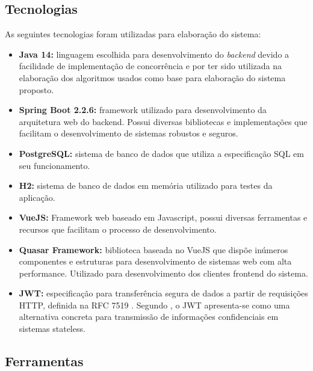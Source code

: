 \subsection{Tecnologias}

As seguintes tecnologias foram utilizadas para elaboração do sistema:

\begin{itemize}
    \item \textbf{Java 14:} linguagem escolhida para desenvolvimento do \textit{backend} devido a facilidade de implementação de concorrência e por ter sido utilizada na elaboração dos algoritmos usados como base para elaboração do sistema proposto.
    
    \item \textbf{Spring Boot 2.2.6:} framework utilizado para desenvolvimento da arquitetura web do backend. Possui diversas bibliotecas e implementações que facilitam o desenvolvimento de sistemas robustos e seguros.
    
    \item \textbf{PostgreSQL:} sistema de banco de dados que utiliza a especificação SQL em seu funcionamento.
    
    \item \textbf{H2:} sistema de banco de dados em memória utilizado para testes da aplicação.
    
    \item \textbf{VueJS:} Framework web baseado em Javascript, possui diversas ferramentas e recursos que facilitam o processo de desenvolvimento. 
    
    \item \textbf{Quasar Framework:} biblioteca baseada no VueJS que dispõe inúmeros componentes e estruturas para desenvolvimento de sistemas web com alta performance. Utilizado para desenvolvimento dos clientes frontend do sistema.
    
    \item \textbf{JWT:} especificação para transferência segura de dados a partir de requisições HTTP, definida na RFC 7519 \cite{ietftools}. Segundo , o JWT apresenta-se como uma alternativa concreta para transmissão de informações confidenciais em sistemas stateless.
\end{itemize}


\subsection{Ferramentas}

